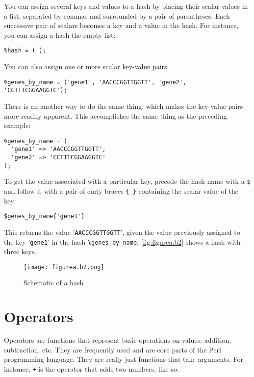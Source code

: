 You can assign several keys and values to a hash by placing their scalar values in a list, separated by commas and surrounded by a pair of parentheses. Each successive pair of scalars becomes a key and a value in the hash. For instance, you can assign a hash the empty list:

\begin{lstlisting}
%hash = ( );
\end{lstlisting}

You can also assign one or more scalar key-value pairs:

\begin{lstlisting}
%genes_by_name = ('gene1', 'AACCCGGTTGGTT', 'gene2', 'CCTTTCGGAAGGTC');
\end{lstlisting}

There is an another way to do the same thing, which makes the key-value pairs more readily apparent. This accomplishes the same thing as the preceding example:

\begin{lstlisting}
%genes_by_name = (
  'gene1' => 'AACCCGGTTGGTT',
  'gene2' => 'CCTTTCGGAAGGTC'
);
\end{lstlisting}

To get the value associated with a particular key, precede the hash name with a \verb|$| and follow it with a pair of curly braces \verb|{ }| containing the scalar value of the key:

\begin{lstlisting}
$genes_by_name{'gene1'}
\end{lstlisting}

This returns the value '\verb|AACCCGGTTGGTT|', given the value previously assigned to the key '\verb|gene1|' in the hash \verb|%genes_by_name|. \autoref{fig:figurea.b2} shows a hash with three keys. 

\begin{figure}
  \centering
  \texttt{[image: figurea.b2.png]}
  \caption{Schematic of a hash}
  \label{fig:figurea.b2}
 \end{figure}{}

\section{Operators}
Operators are functions that represent basic operations on values: addition, subtraction, etc. They are frequently used and are core parts of the Perl programming language. They are really just functions that take arguments. For instance, \verb|+| is the operator that adds two numbers, like so:

